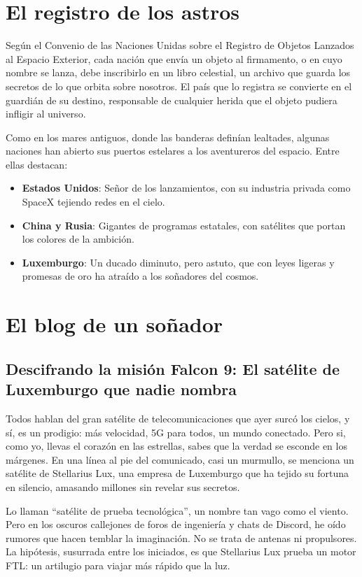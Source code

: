 \section{El registro de los astros}

Según el Convenio de las Naciones Unidas sobre el Registro de Objetos Lanzados al Espacio Exterior, cada nación que envía un objeto al firmamento, o en cuyo nombre se lanza, debe inscribirlo en un libro celestial, un archivo que guarda los secretos de lo que orbita sobre nosotros. El país que lo registra se convierte en el guardián de su destino, responsable de cualquier herida que el objeto pudiera infligir al universo.

Como en los mares antiguos, donde las banderas definían lealtades, algunas naciones han abierto sus puertos estelares a los aventureros del espacio. Entre ellas destacan:

\begin{itemize}
    \item \textbf{Estados Unidos}: Señor de los lanzamientos, con su industria privada como SpaceX tejiendo redes en el cielo.
    \item \textbf{China y Rusia}: Gigantes de programas estatales, con satélites que portan los colores de la ambición.
    \item \textbf{Luxemburgo}: Un ducado diminuto, pero astuto, que con leyes ligeras y promesas de oro ha atraído a los soñadores del cosmos.
\end{itemize}

\section{El blog de un soñador}

\subsection*{Descifrando la misión Falcon 9: El satélite de Luxemburgo que nadie nombra}

Todos hablan del gran satélite de telecomunicaciones que ayer surcó los cielos, y sí, es un prodigio: más velocidad, 5G para todos, un mundo conectado. Pero si, como yo, llevas el corazón en las estrellas, sabes que la verdad se esconde en los márgenes. En una línea al pie del comunicado, casi un murmullo, se menciona un satélite de Stellarius Lux, una empresa de Luxemburgo que ha tejido su fortuna en silencio, amasando millones sin revelar sus secretos.

Lo llaman ``satélite de prueba tecnológica'', un nombre tan vago como el viento. Pero en los oscuros callejones de foros de ingeniería y chats de Discord, he oído rumores que hacen temblar la imaginación. No se trata de antenas ni propulsores. La hipótesis, susurrada entre los iniciados, es que Stellarius Lux prueba un motor FTL: un artilugio para viajar más rápido que la luz.

